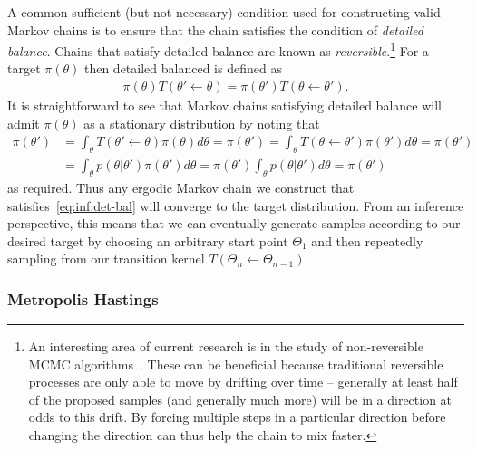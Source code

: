 A common sufficient (but not necessary) condition used for constructing valid Markov chains
is to ensure that the chain satisfies the condition of \emph{detailed balance}.  Chains that
satisfy detailed balance are known as 
\emph{reversible}.\footnote{An interesting area of current research is in the study
	of non-reversible MCMC algorithms~\citep{bouchard2015bouncy,bierkens2016zig}.  These can
	be beneficial because traditional reversible processes are only able to move by drifting over time -- generally
	at least half of the proposed samples (and generally much more) will be in a direction at odds to
	this drift.  By forcing multiple steps in a particular direction before changing the direction can thus
	help  the chain to mix faster.}
For a target $\pi(\theta)$ then detailed balanced is defined as
\begin{align}
\label{eq:inf:det-bal}
\pi(\theta) T(\theta' \leftarrow \theta) = \pi(\theta') T(\theta \leftarrow \theta').
\end{align}
It is straightforward to see that Markov chains satisfying detailed balance will admit $\pi(\theta)$
as a stationary distribution by noting that
\begin{align}
\pi(\theta') &= \int_{\theta} T(\theta' \leftarrow \theta) \pi(\theta)d\theta = \pi(\theta') = 
\int_{\theta} T(\theta \leftarrow \theta') \pi(\theta')d\theta = \pi(\theta') \\
&= \int_{\theta} p(\theta|\theta') \pi(\theta')d\theta = \pi(\theta') \int_{\theta} p(\theta|\theta') d\theta = \pi(\theta')
\end{align}
as required.  Thus any ergodic Markov chain we construct that satisfies~\eqref{eq:inf:det-bal}
will converge to the target distribution.  From an inference perspective, this means that
we can eventually generate samples according to our desired target by choosing an 
arbitrary start point $\Theta_1$ and then repeatedly sampling from our transition kernel $T(\Theta_n \leftarrow \Theta_{n-1})$.

\subsubsection{Metropolis Hastings}
\label{sec:inf:foundation:mcmc:mh}

